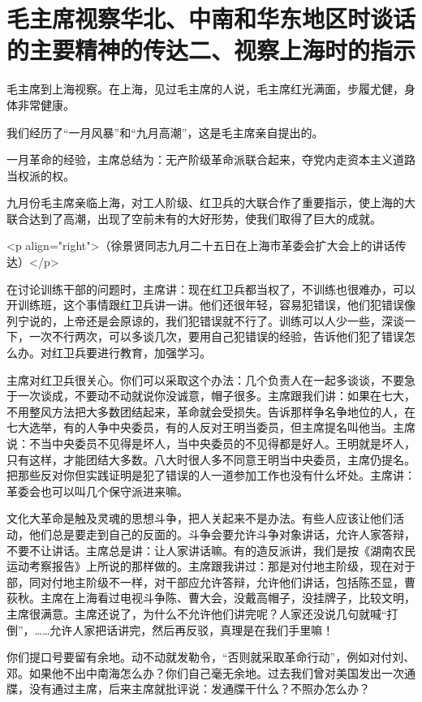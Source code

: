 \section[毛主席视察华北、中南和华东地区时谈话的主要精神的传达二、视察上海时的指示]{毛主席视察华北、中南和华东地区时谈话的主要精神的传达二、视察上海时的指示}


毛主席到上海视察。在上海，见过毛主席的人说，毛主席红光满面，步履尤健，身体非常健康。

我们经历了“一月风暴”和“九月高潮”，这是毛主席亲自提出的。

一月革命的经验，主席总结为：无产阶级革命派联合起来，夺党内走资本主义道路当权派的权。

九月份毛主席亲临上海，对工人阶级、红卫兵的大联合作了重要指示，使上海的大联合达到了高潮，出现了空前未有的大好形势，使我们取得了巨大的成就。

<p align="right">（徐景贤同志九月二十五日在上海市革委会扩大会上的讲话传达）</p>

在讨论训练干部的问题时，主席讲：现在红卫兵都当权了，不训练也很难办，可以开训练班，这个事情跟红卫兵讲一讲。他们还很年轻，容易犯错误，他们犯错误像列宁说的，上帝还是会原谅的，我们犯错误就不行了。训练可以人少一些，深谈一下，一次不行两次，可以多谈几次，要用自己犯错误的经验，告诉他们犯了错误怎么办。对红卫兵要进行教育，加强学习。

主席对红卫兵很关心。你们可以采取这个办法：几个负责人在一起多谈谈，不要急于一次谈成，不要动不动就说你没诚意，帽子很多。主席跟我们讲：如果在七大，不用整风方法把大多数团结起来，革命就会受损失。告诉那样争名争地位的人，在七大选举，有的人争中央委员，有的人反对王明当委员，但主席提名叫他当。主席说：不当中央委员不见得是坏人，当中央委员的不见得都是好人。王明就是坏人，只有这样，才能团结大多数。八大时很人多不同意王明当中央委员，主席仍提名。把那些反对你但实践证明是犯了错误的人一道参加工作也没有什么坏处。主席讲：革委会也可以叫几个保守派进来嘛。

文化大革命是触及灵魂的思想斗争，把人关起来不是办法。有些人应该让他们活动，他们总是要走到自己的反面的。斗争会要允许斗争对象讲话，允许人家答辩，不要不让讲话。主席总是讲：让人家讲话嘛。有的造反派讲，我们是按《湖南农民运动考察报告》上所说的那样做的。主席跟我讲过：那是对付地主阶级，现在对于部，同对付地主阶级不一样，对干部应允许答辩，允许他们讲话，包括陈丕显，曹荻秋。主席在上海看过电视斗争陈、曹大会，没戴高帽子，没挂牌子，比较文明，主席很满意。主席还说了，为什么不允许他们讲完呢？人家还没说几句就喊“打倒”，……允许人家把话讲完，然后再反驳，真理是在我们手里嘛！

你们提口号要留有余地。动不动就发勒令，“否则就采取革命行动”，例如对付刘、邓。如果他不出中南海怎么办？你们自己毫无余地。过去我们曾对美国发出一次通牒，没有通过主席，后来主席就批评说：发通牒干什么？不照办怎么办？

